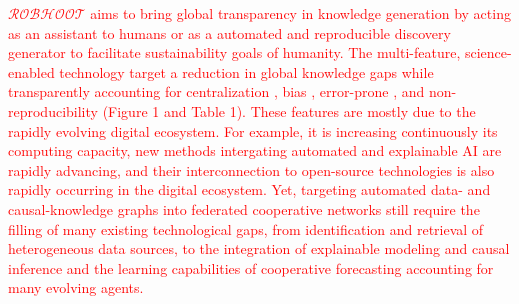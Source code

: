 \documentclass[11pt, a4paper]{article} %
\begin{document}
 \textcolor{red}{$\mathcal{ROBHOOT}$ aims to bring global transparency in knowledge
  generation by acting as an assistant to humans or as a automated and
  reproducible discovery generator to facilitate sustainability goals
  of humanity. The multi-feature, science-enabled technology target a
  reduction in global knowledge gaps while transparently accounting
  for centralization \citep{Inhaber1977,Gunther2018}⁠⁠, bias⁠⁠
  \citep{Ioannidis2005}, error-prone \citep{Fang2011}, and
  non-reproducibility \citep{Hardwicke2018} (Figure 1 and Table
  1). These features are mostly due to the rapidly evolving digital
  ecosystem. For example, it is increasing continuously its computing
  capacity, new methods intergating automated and explainable AI are
  rapidly advancing, and their interconnection to open-source
  technologies is also rapidly occurring in the digital
  ecosystem. Yet, targeting automated data- and causal-knowledge
  graphs into federated cooperative networks still require the filling
  of many existing technological gaps, from identification and
  retrieval of heterogeneous data sources, to the integration of
  explainable modeling and causal inference and the learning
  capabilities of cooperative forecasting accounting for many evolving
  agents.}

\end{document}
